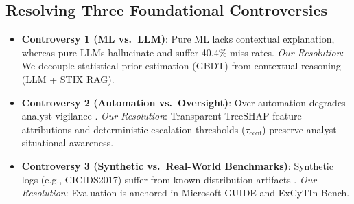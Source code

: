 \subsection{Resolving Three Foundational Controversies}
\begin{itemize}
    \item \textbf{Controversy 1 (ML vs.\ LLM)}: Pure ML lacks contextual explanation, whereas pure LLMs hallucinate and suffer 40.4\% miss rates. \textit{Our Resolution}: We decouple statistical prior estimation (GBDT) from contextual reasoning (LLM + STIX RAG).
    \item \textbf{Controversy 2 (Automation vs.\ Oversight)}: Over-automation degrades analyst vigilance \cite{tilbury2026vigilance}. \textit{Our Resolution}: Transparent TreeSHAP feature attributions and deterministic escalation thresholds ($\tau_{\text{conf}}$) preserve analyst situational awareness.
    \item \textbf{Controversy 3 (Synthetic vs.\ Real-World Benchmarks)}: Synthetic logs (e.g., CICIDS2017) suffer from known distribution artifacts \cite{arp2022dos}. \textit{Our Resolution}: Evaluation is anchored in Microsoft GUIDE and ExCyTIn-Bench.
\end{itemize}

